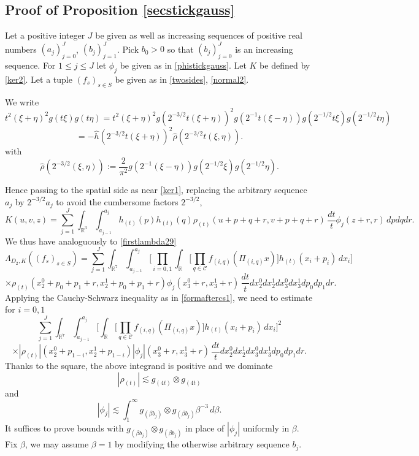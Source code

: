 \documentclass[12pt,reqno]{amsart}
\theoremstyle{plain}
\theoremstyle{definition}
\numberwithin{equation}{section}
\newcommand{\R}{{\mathbb R}}
\begin{document}
\subsection{Proof of Proposition  \ref{secstickgauss}}\label{sec:9.2}


 Let a positive integer $J$ be given as well as increasing sequences
 of positive real numbers  $(a_j)_{j=0}^J$, $(b_j)_{j=1}^J$.
Pick $b_0>0$ so that   $(b_j)_{j=0}^J$ is an increasing sequence.
For $1\le j\le J$  let $\phi_{j}$ be given as in \eqref{phistickgauss}.
Let $K$ be defined by \eqref{ker2}.
Let a tuple $(f_s)_{s\in S}$ be given as in \eqref{twosides}, \eqref{normal2}.


 We write
 \[ t^2(\xi+\eta)^2
    g(t\xi)g(t\eta) = t^2(\xi+\eta)^2g(2^{-3/2}t(\xi+\eta))^2g(2^{-1}t(\xi-\eta)) g(2^{-1/2}t\xi)g(2^{-1/2}t\eta)
\]
\[  = -\widehat{h}(2^{-3/2}t(\xi+\eta))^2\widehat{\rho}(2^{-3/2}t(\xi,\eta)).
\]
with
\[
\widehat{\rho}(2^{-3/2}(\xi,\eta)):=\frac{2}{\pi^2}g(2^{-1}(\xi-\eta)) g(2^{-1/2}\xi)g(2^{-1/2}\eta).
\]

Hence passing to the spatial side as near \eqref{ker1}, replacing the arbitrary
sequence $a_j$ by $2^{-3/2}a_j$ to avoid the cumbersome factors $2^{-3/2}$,
\begin{equation*}
{K}(u,v,z)= \sum_{j=1}^J \int_{\R^3}\int_{a_{j-1}}^{a_j}
    h_{(t)}(p)
    h_{(t)}(q) {\rho_{(t)}}(u+p+q+r,v+p+q+r)\, \frac{dt}t
    \phi_{j}(z+r,r) \,dpdqdr. 
\end{equation*}
 We thus have analoguously to \eqref{firstlambda29}
\[ \Lambda_{D_2,K}((f_s)_{s\in S})=
\sum_{j=1}^J  \int_{\R^7}  \int_{a_{j-1}}^{a_j}
\Big[\prod_{i=0,1} \int_{\R} \Big[ \prod_{q\in \mathcal{C}} f_{(i,q)}(\Pi_{(i,q)}x) \Big] h_{(t)}(x_i+p_i) \,dx_i\Big]     \]
\[ \times \rho_{(t)}(x_2^0+p_0+p_1+r,x_2^1+p_0+p_1+r) \phi_j(x_3^0+r,x_3^1+r)  \, \frac{dt}t dx_2^0 dx_2^1 dx_3^0 dx_3^1 dp_0 dp_1 dr  . \] 
Applying the Cauchy-Schwarz inequality 
as in \eqref{formaftercs1}, we need to estimate for $i=0,1$
\[\sum_{j=1}^J \int_{\R^7} \int_{a_{j-1}}^{a_j}
\Big[ \int_{\R} \Big[ \prod_{q\in \mathcal{C}} f_{(i,q)}(\Pi_{(i,q)}x) \Big] h_{(t)}(x_i+p_i)\, dx_i\Big]^2     \]
\[ \times |\rho_{(t)}|(x_2^0+p_{1-i},x_2^1+p_{1-i})|\phi_j|(x_3^0+r,x_3^1+r)\,
\frac{dt}t dx_2^0dx_2^1dx_3^0dx_3^1dp_0dp_1dr .
\]
Thanks to the square, the above integrand is positive and we dominate
\[|\rho_{(t)}|\lesssim g_{(4t)}\otimes g_{(4t)}  \]
and 
\[|\phi_j|\lesssim \int_1^\infty g_{(\beta b_j)}\otimes  g_{(\beta b_j)}\beta^{-3}\, d\beta. \]
It suffices to prove bounds with $g_{(\beta b_j)}\otimes g_{(\beta b_j)}$
in place of $|\phi_j|$ uniformly in $\beta$. Fix $\beta$, we may assume $\beta=1$ by modifying the otherwise arbitrary sequence  $b_j$.
\end{document}
